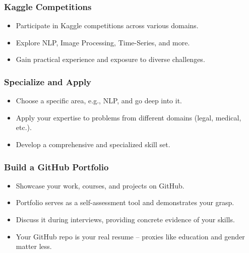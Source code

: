 \begin{frame}[fragile]\frametitle{Kaggle Competitions}

        \begin{itemize}
            \item Participate in Kaggle competitions across various domains.
            \item Explore NLP, Image Processing, Time-Series, and more.
            \item Gain practical experience and exposure to diverse challenges.
        \end{itemize}
			
\end{frame}

\begin{frame}[fragile]\frametitle{Specialize and Apply}

        \begin{itemize}
            \item Choose a specific area, e.g., NLP, and go deep into it.
            \item Apply your expertise to problems from different domains (legal, medical, etc.).
            \item Develop a comprehensive and specialized skill set.
        \end{itemize}
			
\end{frame}

\begin{frame}[fragile]\frametitle{Build a GitHub Portfolio}


        \begin{itemize}
            \item Showcase your work, courses, and projects on GitHub.
            \item Portfolio serves as a self-assessment tool and demonstrates your grasp.
            \item Discuss it during interviews, providing concrete evidence of your skills.
            \item Your GitHub repo is your real resume – proxies like education and gender matter less.
        \end{itemize}
			
\end{frame}

